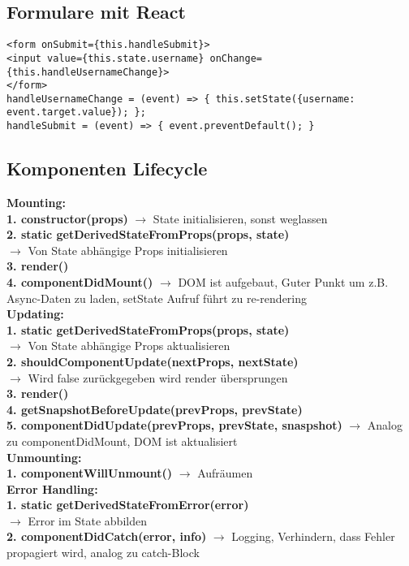 \subsection{Formulare mit React}
\begin{lstlisting}[style=htmlcssjs]
<form onSubmit={this.handleSubmit}>
<input value={this.state.username} onChange={this.handleUsernameChange}>
</form>
handleUsernameChange = (event) => { this.setState({username: event.target.value}); };
handleSubmit = (event) => { event.preventDefault(); }
\end{lstlisting}
\subsection{Komponenten Lifecycle}
\textcolor{b}{\textbf{Mounting:}}\\
\textbf{1. constructor(props)} $\rightarrow$ State initialisieren, sonst weglassen\\
\textbf{2. static getDerivedStateFromProps(props, state)}\\
$\rightarrow$ Von State abhängige Props initialisieren\\
\textbf{3. render()}\\
\textbf{4. componentDidMount()} $\rightarrow$ DOM ist aufgebaut, Guter Punkt um z.B. Async-Daten zu laden, setState Aufruf führt zu re-rendering\\
\textcolor{b}{\textbf{Updating:}}\\
\textbf{1. static getDerivedStateFromProps(props, state)}\\
$\rightarrow$ Von State abhängige Props aktualisieren\\
\textbf{2. shouldComponentUpdate(nextProps, nextState)}\\
$\rightarrow$ Wird false zurückgegeben wird render übersprungen\\
\textbf{3. render()}\\
\textbf{4. getSnapshotBeforeUpdate(prevProps, prevState)}\\
\textbf{5. componentDidUpdate(prevProps, prevState, snaspshot)} $\rightarrow$ Analog zu componentDidMount, DOM ist aktualisiert\\
\textcolor{b}{\textbf{Unmounting:}}\\
\textbf{1. componentWillUnmount()} $\rightarrow$ Aufräumen\\
\textcolor{b}{\textbf{Error Handling:}}\\
\textbf{1. static getDerivedStateFromError(error)}\\
$\rightarrow$ Error im State abbilden\\
\textbf{2. componentDidCatch(error, info)} $\rightarrow$ Logging, Verhindern, dass Fehler propagiert wird, analog zu catch-Block
